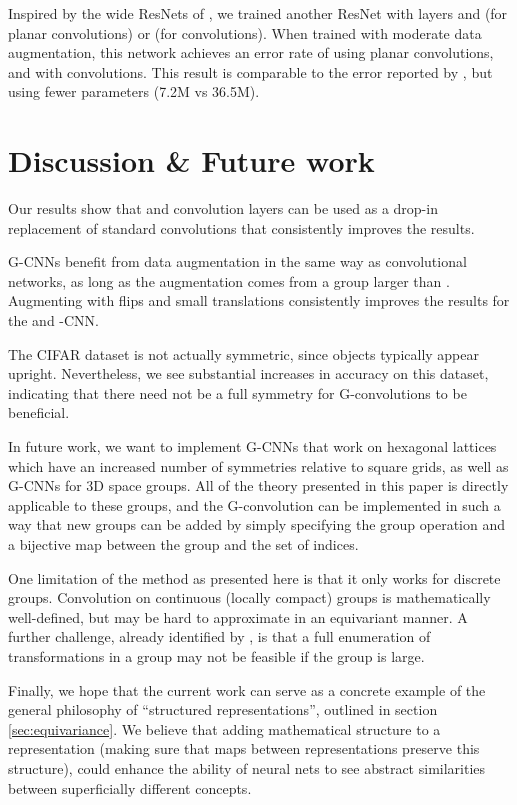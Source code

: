 \documentclass{article}
\begin{document}
Inspired by the wide ResNets of \citet{Zagoruyko2016}, we trained another ResNet with  layers and  (for planar convolutions) or  (for  convolutions).
When trained with moderate data augmentation, this network achieves an error rate of  using planar convolutions, and  with  convolutions.
This result is comparable to the  error reported by \citet{Zagoruyko2016}, but using fewer parameters (7.2M vs 36.5M).


\section{Discussion \& Future work}
\label{sec:discussion}

Our results show that  and  convolution layers can be used as a drop-in replacement of standard convolutions that consistently improves the results.

G-CNNs benefit from data augmentation in the same way as convolutional networks,
as long as the augmentation comes from a group larger than .
Augmenting with flips and small translations consistently improves the results for the  and -CNN.

The CIFAR dataset is not actually symmetric, since objects typically appear upright.
Nevertheless, we see substantial increases in accuracy on this dataset, indicating that there need not be a full symmetry for G-convolutions to be beneficial.

In future work, we want to implement G-CNNs that work on hexagonal lattices which have an increased number of symmetries relative to square grids, as well as G-CNNs for 3D space groups.
All of the theory presented in this paper is directly applicable to these groups, and the G-convolution can be implemented in such a way that new groups can be added by simply specifying the group operation and a bijective map between the group and the set of indices.

One limitation of the method as presented here is that it only works for discrete groups.
Convolution on continuous (locally compact) groups is mathematically well-defined, but may be hard to approximate in an equivariant manner.
A further challenge, already identified by \citet{Gensa}, is that a full enumeration of transformations in a group may not be feasible if the group is large.

Finally, we hope that the current work can serve as a concrete example of the general philosophy of ``structured representations'', outlined in section \ref{sec:equivariance}.
We believe that adding mathematical structure to a representation (making sure that maps between representations preserve this structure), could enhance the ability of neural nets to see abstract similarities between superficially different concepts.
\end{document}
